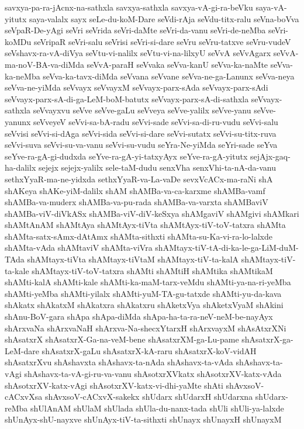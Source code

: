 {savxya-pa-ra-jAcnx-na-sathxla
savxya-sathxla
savxya-vA-gi-ra-beVku
saya-vA-yitutx
saya-valalx
sayx
seLe-du-koM-Dare
seVdi-rAja
seVdu-titx-ralu
seVna-boVva
seVpaR-De-yAgi
seVri
seVrida
seVri-daMte
seVri-da-vanu
seVri-de-neMba
seVri-koMDu
seVripaR
seVri-salu
seVrisi
seVri-si-dare
seVru
seVru-tatxve
seVru-vudeV
seVshavx-ra-vA-diVya
seVtu-vi-nalilx
seVtu-vi-na-lilxyU
seVvA
seVvAgarx
seVvA-ma-noV-BA-va-diMda
seVvA-paraH
seVvaka
seVva-kanU
seVva-ka-naMte
seVva-ka-neMba
seVva-ka-tavx-diMda
seVvana
seVvane
seVva-ne-ga-Lanunx
seVva-neya
seVva-ne-yiMda
seVvayx
seVvayxM
seVvayx-parx-sAda
seVvayx-parx-sAdi
seVvayx-parx-sA-di-ga-LeM-boM-batutx
seVvayx-parx-sA-di-sathxla
seVvayx-sathxla
seVvayxvu
seVve
seVve-gaLu
seVveya
seVve-yalilx
seVve-yanu
seVve-yanunx
seVveyeV
seVvi-sa-bA-radu
seVvi-sade
seVvi-sa-di-ru-vudu
seVvi-salu
seVvisi
seVvi-si-dAga
seVvi-sida
seVvi-si-dare
seVvi-sutatx
seVvi-su-titx-ruva
seVvi-suva
seVvi-su-va-vanu
seVvi-su-vudu
seYra-Ne-yiMda
seYri-sade
seYva
seYve-ra-gA-gi-dudxda
seYve-ra-gA-yi-tatxyAyx
seYve-ra-gA-yitutx
sejAjx-gaq-ha-dalilx
sejejx
sejejx-yalilx
sele-taM-dudu
senxVha
senxVhi-ta-nA-da-vanu
sethxYyaR-ma-ne-yidxda
sethxYyaR-va-La-vaDe
sevxVcACx-ma-raNi
shA
shAKeya
shAKe-yiM-dalilx
shAM
shAMBa-va-ca-karxme
shAMBa-vamf
shAMBa-va-muderx
shAMBa-va-pu-rada
shAMBa-va-varxta
shAMBaviV
shAMBa-viV-diVkASx
shAMBa-viV-diV-keSxya
shAMgaviV
shAMgivi
shAMkari
shAMtAnAM
shAMtAya
shAMtAyx-tiVta
shAMtAyx-tiV-toV-tatxra
shAMta
shAMta-satx-sAmx-dAtAmx
shAMta-sithxti
shAMta-su-Ka-vi-ra-lo-lalxde
shAMta-vAda
shAMtaviV
shAMta-viVra
shAMtayx-tiV-tA-di-ka-le-ga-LiM-duM-TAda
shAMtayx-tiVta
shAMtayx-tiVtaM
shAMtayx-tiV-ta-kalA
shAMtayx-tiV-ta-kale
shAMtayx-tiV-toV-tatxra
shAMti
shAMtiH
shAMtika
shAMtikaM
shAMti-kalA
shAMti-kale
shAMti-ka-maM-tarx-veMdu
shAMti-ya-na-ri-yeMba
shAMti-yeMba
shAMti-yilalx
shAMti-yuM-TA-gu-tatxde
shAMti-yu-da-kava
shAkatx
shAkatxM
shAkatxra
shAkatxru
shAketxVya
shAketxVyaM
shAkini
shAnu-BoV-gara
shApa
shApa-diMda
shApa-ha-ta-ra-neV-neM-be-nayAyx
shArxvaNa
shArxvaNaH
shArxva-Na-shecxYtarxH
shArxvayxM
shAsAtxrXNi
shAsatxrX
shAsatxrX-Ga-na-veM-bene
shAsatxrXM-ga-Lu-pame
shAsatxrX-ga-LeM-dare
shAsatxrX-gaLu
shAsatxrX-kA-raru
shAsatxrX-koV-vidAH
shAsatxrXvu
shAshavxta
shAshavx-ta-nAda
shAshavx-ta-vAda
shAshavx-ta-vAgi
shAshavx-ta-vA-gi-ru-va-vanu
shAsotxrXVkatx
shAsotxrXV-katx-vAda
shAsotxrXV-katx-vAgi
shAsotxrXV-katx-vi-dhi-yaMte
shAti
shAvxsoV-cACxvXsa
shAvxsoV-cACxvX-sakekx
shUdarx
shUdarxH
shUdarxna
shUdarx-reMba
shUlAnAM
shUlaM
shUlada
shUla-du-nanx-tada
shUli
shUli-ya-lalxde
shUnAyx-shU-nayxve
shUnAyx-tiV-ta-sithxti
shUnayx
shUnayxH
shUnayxM
}

